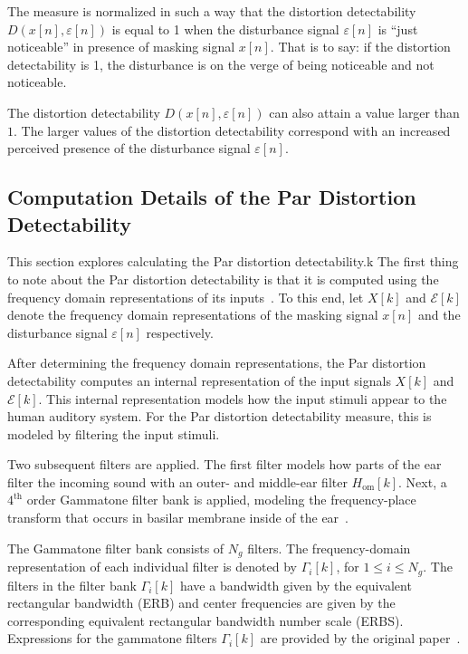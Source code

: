 The measure is normalized in such a way that the distortion detectability $D(x[n],\varepsilon[n])$ is equal to 1 when the disturbance signal $\varepsilon[n]$ is ``just noticeable'' in presence of masking signal $x[n]$.
That is to say: if the distortion detectability is 1, the disturbance is on the verge of being noticeable and not noticeable.

The distortion detectability $D(x[n],\varepsilon[n])$ can also attain a value larger than $1$.
The larger values of the distortion detectability correspond with an increased perceived presence of the disturbance signal $\varepsilon[n]$.

\subsection{Computation Details of the Par Distortion Detectability}
\label{ch:perceptual:implementation:computation}
This section explores calculating the Par distortion detectability.k
The first thing to note about the Par distortion detectability is that it is computed using the frequency domain representations of its inputs~\cite{van2005perceptual}. 
To this end, let $X[k]$ and $\mathcal{E}[k]$ denote the frequency domain representations of the masking signal $x[n]$ and 
the disturbance signal $\varepsilon[n]$ respectively.

After determining the frequency domain representations, 
the Par distortion detectability computes an internal representation of the input signals $X[k]$ and $\mathcal{E}[k]$.
This internal representation models how the input stimuli appear to the human auditory system.
For the Par distortion detectability measure, this is modeled by filtering the input stimuli.

Two subsequent filters are applied.
The first filter models how parts of the ear filter the incoming sound with an outer- and middle-ear filter $H_\text{om}[k]$. 
Next, a $4^\text{th}$ order Gammatone filter bank is applied, modeling the frequency-place transform that occurs in 
basilar membrane inside of the ear~\cite{van2005perceptual}.

The Gammatone filter bank consists of $N_g$ filters.
The frequency-domain representation of each individual filter is denoted by $\Gamma_i[k]$, for $1 \leq i \leq N_g$. 
The filters in the filter bank $\Gamma_i[k]$ have a bandwidth given by the equivalent 
rectangular bandwidth (ERB) and center frequencies are given by the corresponding equivalent rectangular bandwidth number
scale (ERBS).
Expressions for the gammatone filters $\Gamma_i[k]$ are provided by the original paper~\cite{van2005perceptual}.

